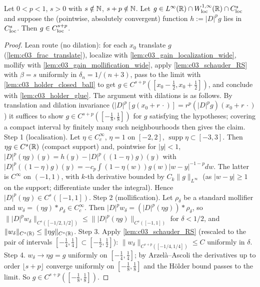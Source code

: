 \begin{lemma}
  \label{lem:c03_linear_gain}
  Let $0<p<1$, $s>0$ with $s\notin\mathbb{N}$, $s+p\notin\mathbb{N}$. Let $g\in L^\infty(\mathbb{R})\cap W^{1,\infty}_{\textup{loc}}(\mathbb{R})\cap C^s_{\textup{loc}}$ and suppose the (pointwise, absolutely convergent) function
  $h:=|D|^pg$ lies in $C^s_{\textup{loc}}$. Then $g\in C^{s+p}_{\textup{loc}}$.
\end{lemma}
\begin{proof}
  Lean route (no dilation): for each $x_0$ translate $g$ (\cref{lem:c03_frac_translate}), localize with
  \cref{lem:c03_gain_localization_wide}, mollify with \cref{lem:c03_gain_mollification_wide}, apply
  \cref{lem:c03_schauder_RS} with $\beta=s$ uniformly in $\delta_n=1/(n+3)$, pass to the limit with
  \cref{lem:c03_holder_closed_ball} to get $g\in C^{s+p}([x_0-\frac12,x_0+\frac12])$, and conclude with
  \cref{lem:c03_holder_glue}. The argument with dilations is as follows.
  By translation and dilation invariance ($|D|^p[g(x_0+r\,\cdot)]=r^p(|D|^pg)(x_0+r\,\cdot)$) it suffices to show $g\in C^{s+p}([-\frac18,\frac18])$ for $g$ satisfying the hypotheses; covering a compact interval by finitely many such neighbourhoods then gives the claim.
  Step 1 (localisation). Let $\eta\in C_c^\infty$, $\eta=1$ on $[-2,2]$, $\operatorname{supp}\eta\subset[-3,3]$. Then $\eta g\in C^s(\mathbb{R})$ (compact support) and, pointwise for $|y|<1$,
  $|D|^p(\eta g)(y)=h(y)-|D|^p((1-\eta)g)(y)$ with $|D|^p((1-\eta)g)(y)=-c_p\int(1-\eta(w))g(w)|w-y|^{-1-p}dw$.
  The latter is $C^\infty$ on $(-1,1)$, with $k$-th derivative bounded by $C_k\|g\|_{L^\infty}$ (as $|w-y|\ge1$ on the support; differentiate under the integral). Hence $|D|^p(\eta g)\in C^s([-1,1])$.
  Step 2 (mollification). Let $\rho_\delta$ be a standard mollifier and $w_\delta=(\eta g)*\rho_\delta\in C^\infty_c$. Then $|D|^pw_\delta=(|D|^p(\eta g))*\rho_\delta$, so
  $\||D|^pw_\delta\|_{C^s([-1/2,1/2])}\le\||D|^p(\eta g)\|_{C^s([-1,1])}$ for $\delta<1/2$, and $\|w_\delta\|_{C^s(\mathbb{R})}\le\|\eta g\|_{C^s(\mathbb{R})}$.
  Step 3. Apply \cref{lem:c03_schauder_RS} (rescaled to the pair of intervals $[-\frac14,\frac14]\subset[-\frac12,\frac12]$): $\|w_\delta\|_{C^{s+p}([-1/4,1/4])}\le C$ uniformly in $\delta$.
  Step 4. $w_\delta\to\eta g=g$ uniformly on $[-\frac14,\frac14]$; by Arzel\`a--Ascoli the derivatives up to order $\lfloor s+p\rfloor$ converge uniformly on $[-\frac18,\frac18]$ and the H\"older bound passes to the limit. So $g\in C^{s+p}([-\frac18,\frac18])$.
\end{proof}

